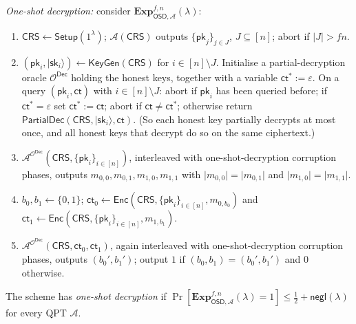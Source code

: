 \documentclass{conjura-conjecture}
\newcommand{\ket}[1]{\lvert #1 \rangle}
\newcommand{\negl}{\mathsf{negl}}
\newcommand{\Setup}{\mathsf{Setup}}
\newcommand{\KeyGen}{\mathsf{KeyGen}}
\newcommand{\Enc}{\mathsf{Enc}}
\newcommand{\Dec}{\mathsf{Dec}}
\newcommand{\PartialDec}{\mathsf{PartialDec}}
\newcommand{\CRS}{\mathsf{CRS}}
\newcommand{\pk}{\mathsf{pk}}
\newcommand{\sk}{\mathsf{sk}}
\newcommand{\ct}{\mathsf{ct}}
\begin{document}
\begin{definition}
\emph{One-shot decryption:} consider
$\mathbf{Exp}^{f,n}_{\mathsf{OSD}, \mathcal{A}}(\lambda)$:
\begin{enumerate}[leftmargin=1.6em]
  \item $\CRS \gets \Setup(1^{\lambda})$; $\mathcal{A}(\CRS)$ outputs
    $\{\pk_{j}\}_{j \in J}$, $J \subseteq [n]$; abort if $\lvert J
    \rvert > f n$.
  \item $(\pk_{i}, \ket{\sk_{i}}) \gets \KeyGen(\CRS)$ for $i \in [n]
    \setminus J$. Initialise a partial-decryption oracle
    $\mathcal{O}^{\Dec}$ holding the honest keys, together with a
    variable $\ct^{*} := \varepsilon$. On a query $(\pk_{i}, \ct)$
    with $i \in [n] \setminus J$: abort if $\pk_{i}$ has been queried
    before; if $\ct^{*} = \varepsilon$ set $\ct^{*} := \ct$; abort if
    $\ct \neq \ct^{*}$; otherwise return $\PartialDec(\CRS,
    \ket{\sk_{i}}, \ct)$. (So each honest key partially decrypts at
    most once, and all honest keys that decrypt do so on the same
    ciphertext.)
  \item $\mathcal{A}^{\mathcal{O}^{\Dec}}(\CRS, \{\pk_{i}\}_{i \in
    [n]})$, interleaved with one-shot-decryption corruption phases,
    outputs $m_{0,0}, m_{0,1}, m_{1,0}, m_{1,1}$ with $\lvert m_{0,0}
    \rvert = \lvert m_{0,1} \rvert$ and $\lvert m_{1,0} \rvert =
    \lvert m_{1,1} \rvert$.
  \item $b_{0}, b_{1} \gets \{0,1\}$; $\ct_{0} \gets \Enc(\CRS,
    \{\pk_{i}\}_{i \in [n]}, m_{0,b_{0}})$ and $\ct_{1} \gets
    \Enc(\CRS, \{\pk_{i}\}_{i \in [n]}, m_{1,b_{1}})$.
  \item $\mathcal{A}^{\mathcal{O}^{\Dec}}(\CRS, \ct_{0}, \ct_{1})$,
    again interleaved with one-shot-decryption corruption phases,
    outputs $(b_{0}', b_{1}')$; output $1$ if $(b_{0}, b_{1}) =
    (b_{0}', b_{1}')$ and $0$ otherwise.
\end{enumerate}
The scheme has \emph{one-shot decryption} if
$\Pr[\mathbf{Exp}^{f,n}_{\mathsf{OSD}, \mathcal{A}}(\lambda) = 1] \le
\tfrac{1}{2} + \negl(\lambda)$ for every QPT $\mathcal{A}$.
\end{definition}
\end{document}
